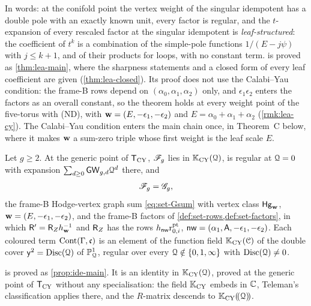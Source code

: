 In words: at the conifold point the vertex weight of the singular idempotent has a double pole with an exactly known unit, every factor is regular, and the $t$-expansion of every rescaled factor at the singular idempotent is \emph{leaf-structured}: the coefficient of $t^k$ is a combination of the simple-pole functions $1/(E-j\psi)$ with $j\leq k+1$, and of their products for loops, with no constant term.  is proved as \cref{thm:lea-main}, where the sharpness statements and a closed form of every leaf coefficient are given (\cref{thm:lea-closed}). Its proof does not use the Calabi--Yau condition: the frame-B rows depend on $(\alpha_0,\alpha_1,\alpha_2)$ only, and $\epsilon_1\epsilon_2$ enters the factors as an overall constant, so the theorem holds at every weight point of the five-torus with (ND), with $\mathbf{w}=(E,-\epsilon_1,-\epsilon_2)$ and $E=\alpha_0+\alpha_1+\alpha_2$ (\cref{rmk:lea-cy}). The Calabi--Yau condition enters the main chain once, in Theorem~C below, where it makes $\mathbf{w}$ a sum-zero triple whose first weight is the leaf scale $E$.

\begin{thm}
\label{thm:int-ident}
Let $g\geq2$. At the generic point of $\mathsf{T}_{\mathrm{CY}}$, $\mathscr{F}_g$ lies in $\mathbb{K}_{\mathrm{CY}}(\mathcal{Q})$, is regular at $\mathcal{Q}=0$ with expansion $\sum_{d\geq0}\mathsf{GW}_{g,d}\mathcal{Q}^d$ there, and
\[
\mathscr{F}_g=\mathscr{G}_g ,
\]
the frame-B Hodge-vertex graph sum \eqref{eq:set-Gsum} with vertex class $\mathsf{Hg}_{\mathbf{w}}$, $\mathbf{w}=(E,-\epsilon_1,-\epsilon_2)$, and the frame-B factors of \cref{def:set-rows,def:set-factors}, in which $\mathsf{R}'=\mathsf{R}_{Z}h_{\mathbf{w}}^{-1}$ and $\mathsf{R}_{Z}$ has the rows $h_{\mathsf{nw}}\mathrm{r}^{\mathrm{pt}}_{0,i}$, $\mathsf{nw}=(\alpha_1,\mathsf{A},-\epsilon_1,-\epsilon_2)$. Each coloured term $\mathrm{Cont}(\Gamma,\mathfrak{c})$ is an element of the function field $\mathbb{K}_{\mathrm{CY}}(\mathcal{C})$ of the double cover $\mathsf{y}^2=\operatorname{Disc}(\mathcal{Q})$ of $\mathbb{P}^1_{\mathcal{Q}}$, regular over every $\mathcal{Q}\notin\{0,1,\infty\}$ with $\operatorname{Disc}(\mathcal{Q})\neq0$.
\end{thm}

 is proved as \cref{prop:ide-main}. It is an identity in $\mathbb{K}_{\mathrm{CY}}(\mathcal{Q})$, proved at the generic point of $\mathsf{T}_{\mathrm{CY}}$ without any specialisation: the field $\mathbb{K}_{\mathrm{CY}}$ embeds in $\mathbb{C}$, Teleman's classification applies there, and the $R$-matrix descends to $\mathbb{K}_{\mathrm{CY}}(\!(\mathcal{Q})\!)$.

